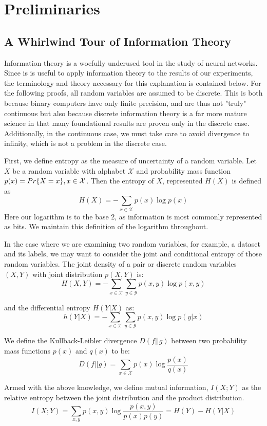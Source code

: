 \chapter{Preliminaries}
\label{chap:two}

\section{A Whirlwind Tour of Information Theory}
Information theory is a woefully underused tool in the study of neural networks. 
Since is is useful to apply information theory to the results of our experiments, the terminology and theory necessary for this explanation is contained below.
For the following proofs, all random variables are assumed to be discrete. 
This is both because binary computers have only finite precision, and are thus not "truly" continuous but also because discrete information theory is a far more mature science in that many foundational results are proven only in the discrete case.
Additionally, in the continuous case, we must take care to avoid divergence to infinity, which is not a problem in the discrete case.

First, we define entropy as the measure of uncertainty of a random variable.
Let $X$ be a random variable with alphabet $\mathcal{X}$ and probability mass function $p(x) = \\Pr\{X = x\}, x \in \mathcal{X}$.
Then the entropy of $X$, represented $H(X)$ is defined as
$$H(X) = -\sum_{x \in \mathcal{X}} p(x) \log{p(x)}$$
Here our logarithm is to the base 2, as information is most commonly represented as bits.
We maintain this definition of the logarithm throughout. 

In the case where we are examining two random variables, for example, a dataset and its labels, we may want to consider the joint and conditional entropy of those random variables.
The joint density of a pair or discrete random variables $(X, Y)$ with joint distribution $p(X, Y)$ is:
$$H(X, Y) = - \sum_{x \in \mathcal{X}} \sum_{y \in \mathcal{Y}} p(x, y) \log{p(x, y)}$$

and the differential entropy $H(Y | X)$ as:
$$ h(Y|X) = -\sum_{x \in \mathcal{X}} \sum_{y \in \mathcal{Y}} p(x, y) \log{p(y|x)}$$

We define the Kullback-Leibler divergence $D(f||g)$ between two probability mass functions $p(x)$ and $q(x)$ to be:
$$D(f||g) = \sum_{x \in \mathcal{X}} p(x) \log{\frac{p(x)}{q(x)}}$$

Armed with the above knowledge, we define mutual information, $I(X; Y)$ as the relative entropy between the joint distribution and the product distribution.
$$I(X; Y) = \sum_{x, y} p(x, y) \log{\frac{p(x,y)}{p(x) p(y)}} = H(Y) - H(Y|X)$$

